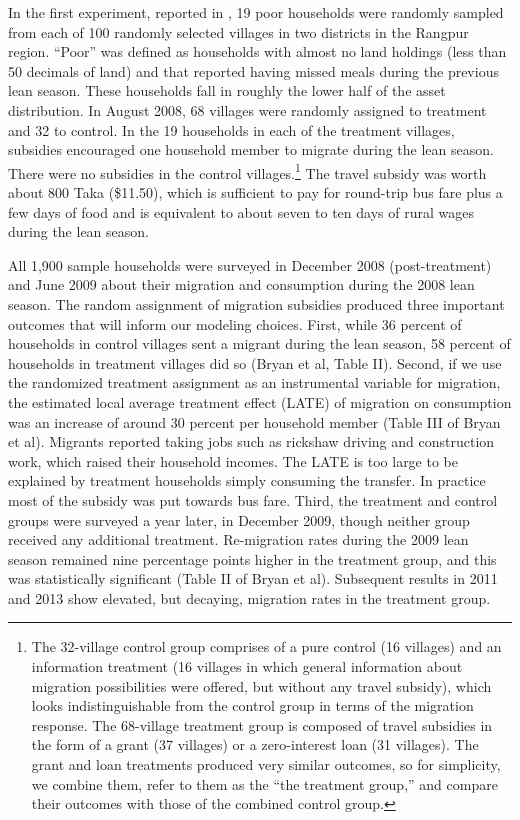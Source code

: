 \documentclass[12pt,pdftex]{article}
\begin{document}
In the first experiment, reported in \citet{brch14}, 19 poor households were randomly sampled from each of 100 randomly selected villages in two districts in the Rangpur region. ``Poor'' was defined as households with almost no land holdings (less than 50 decimals of land) and that reported having missed meals during the previous lean season. These households fall in roughly the lower half of the asset distribution. In August 2008, 68 villages were randomly assigned to treatment and 32 to control. In the 19 households in each of the treatment villages, subsidies encouraged one household member to migrate during the lean season. There were no subsidies in the control villages.\footnote{The 32-village control group comprises of a pure control (16 villages) and an information treatment (16 villages in which general information about migration possibilities were offered, but without any travel subsidy), which looks indistinguishable from the control group in terms of the migration response. The 68-village treatment group is composed of travel subsidies in the form of a grant (37 villages) or a zero-interest loan (31 villages). The grant and loan treatments produced very similar outcomes, so for simplicity, we combine them, refer to them as the ``the treatment group,'' and compare their outcomes with those of the combined control group.} The travel subsidy was worth about 800 Taka (\$11.50), which is sufficient to pay for round-trip bus fare plus a few days of food and is equivalent to about seven to ten days of rural wages during the lean season.

All 1,900 sample households were surveyed in December 2008 (post-treatment) and June 2009 about their migration and consumption during the 2008 lean season. The random assignment of migration subsidies produced three important outcomes that will inform our modeling choices. First, while 36 percent of households in control villages sent a migrant during the lean season, 58 percent of households in treatment villages did so (Bryan et al, Table II). Second, if we use the randomized treatment assignment as an instrumental variable for migration, the estimated local average treatment effect (LATE) of migration on consumption was an increase of around 30 percent per household member (Table III of Bryan et al). Migrants reported taking jobs such as rickshaw driving and construction work, which raised their household incomes. The LATE is too large to be explained by treatment households simply consuming the transfer. In practice most of the subsidy was put towards bus fare. Third, the treatment and control groups were surveyed a year later, in December 2009, though neither group received any additional treatment. Re-migration rates during the 2009 lean season remained nine percentage points higher in the treatment group, and this was statistically significant (Table II of Bryan et al). Subsequent results in 2011 and 2013 show elevated, but decaying, migration rates in the treatment group.
\end{document}

